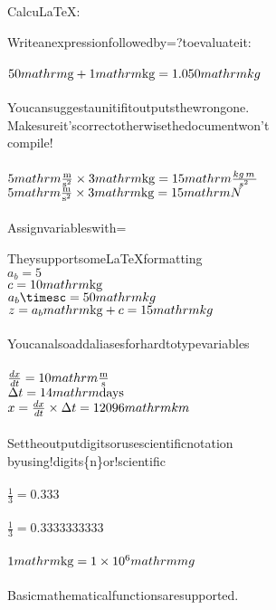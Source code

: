 \documentclass{article}
\begin{document}
CalcuLaTeX:

Writeanexpressionfollowedby=?toevaluateit:
\\\\$50\\mathrm{\mathrm{g}}+1\\mathrm{\mathrm{kg}}=1.050\\mathrm{kg\,}$\\
\\
Youcansuggestaunitifitoutputsthewrongone.\\
Makesureit'scorrectotherwisethedocumentwon't\\
compile!
\\\\$5\\mathrm{\mathrm{\frac{\mathrm{m}}{\mathrm{\mathrm{s}^{2}}}}}\times3\\mathrm{\mathrm{kg}}=15\\mathrm{\frac{kg\,m\,}{s^{2}\,}}$\\
$5\\mathrm{\mathrm{\frac{\mathrm{m}}{\mathrm{\mathrm{s}^{2}}}}}\times3\\mathrm{\mathrm{kg}}=15\\mathrm{N}$\\
\\
Assignvariableswith=

TheysupportsomeLaTeXformatting
\\$a_b=5$\\
$c=10\\mathrm{\mathrm{kg}}$\\
$a_b\timesc=50\\mathrm{kg\,}$\\
$z=a_b\\mathrm{\mathrm{kg}}+c=15\\mathrm{kg\,}$\\
\\
Youcanalsoaddaliasesforhardtotypevariables
\\\\$\frac{dx}{dt}=10\\mathrm{\mathrm{\frac{\mathrm{m}}{\mathrm{s}}}}$\\
$\Delta{t}=14\\mathrm{\mathrm{days}}$\\
$x=\frac{dx}{dt}\times\Delta{t}=12096\\mathrm{km\,}$\\
\\
Settheoutputdigitsorusescientificnotation\\
byusing!digits\{n\}or!scientific
\\\\$\frac{1}{3}=0.333$\\
\\$\frac{1}{3}=0.3333333333$\\
\\$1\\mathrm{\mathrm{kg}}=1\times10^{6}\\mathrm{mg}$\\
\\
Basicmathematicalfunctionsaresupported.
\end{document}
